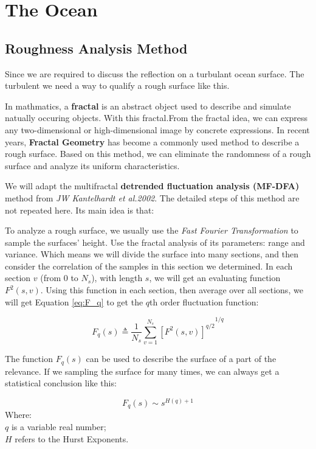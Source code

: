 \documentclass{mcmthesis}
\begin{document}
\section{The Ocean}

  \subsection{Roughness Analysis Method}
    Since we are required to discuss the reflection on a turbulant ocean surface. The turbulent  we need a way to qualify a rough surface like this.

    In mathmatics, a \textbf{fractal} is an abstract object used to describe and simulate natually occuring objects. With this fractal.From the fractal idea, we can express any two-dimensional or high-dimensional image by concrete expressions. In recent years, \textbf{Fractal Geometry} has become a commonly used method to describe a rough surface\cite{lang2015hydraulic,shibuichi1998super}. Based on this method, we can eliminate the randomness of a rough surface and analyze its uniform characteristics.

    We will adapt the multifractal \textbf{detrended fluctuation analysis (MF-DFA)} method from \emph{JW Kantelhardt et al.2002}\cite{kantelhardt2002multifractal}. The detailed steps of this method are not repeated here. Its main idea is that:

    To analyze a rough surface, we usually use the \emph{Fast Fourier Transformation} to sample the surfaces' height. Use the fractal analysis of its parameters: range and variance. Which means we will divide the surface into many sections, and then consider the correlation of the samples in this section we determined. In each section $v$ (from $0$ to $N_s$), with length $s$, we will get an evaluating function $F^2(s,v)$. Using this function in each section, then average over all sections, we will get Equation \ref{eq:F_q} to get the $q$th order fluctuation function:

    \begin{equation}\label{eq:F_q}
      F_q(s) \triangleq {\frac{1}{N_s}\sum_{v=1}^{N_s}[F^2(s,v)]^{q/2}}^{1/q}
    \end{equation}

    The function $F_q(s)$ can be used to describe the surface of a part of the relevance. If we sampling the surface for many times, we can always get a statistical conclusion like this:

    \begin{equation}\label{eq:F_qq}
      F_q(s) \sim s^{H(q) + 1}
    \end{equation}
    Where:\\
    $q$ is a variable real number;\\
    $H$ refers to the Hurst Exponents.
\end{document}
